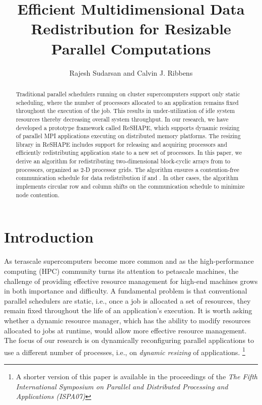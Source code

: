 \documentclass[letterpaper]{llncs}
\title{\bf Efficient Multidimensional Data Redistribution for Resizable Parallel Computations\\ 
}
\author{Rajesh Sudarsan and Calvin J. Ribbens}
\institute{Department of Computer Science\\
Virginia Tech, Blacksburg, VA 24061-0106 \\
\email{\{sudarsar, ribbens\}@vt.edu}}
\begin{document}
\maketitle
\thispagestyle{empty}
\begin{abstract}
Traditional parallel schedulers running on cluster supercomputers
support only static scheduling, where the number of processors
allocated to an application remains fixed throughout the  execution of the job.
This results in under-utilization of idle system resources 
thereby decreasing overall system throughput.
In our research, we have developed a
prototype framework called ReSHAPE, which supports dynamic resizing of
parallel MPI applications executing on distributed memory platforms.
The resizing library in ReSHAPE includes support for releasing and acquiring
processors and efficiently redistributing application state to a new
set of processors. In this paper, we derive an algorithm for redistributing
two-dimensional block-cyclic arrays from  to  processors, organized
as 2-D processor grids. The algorithm ensures
a contention-free communication schedule for data redistribution
if  and .
In other cases, the algorithm implements
circular row and column shifts on the communication schedule
 to minimize node contention.
\end{abstract}


\section{Introduction}
As terascale supercomputers become more common and as the high-performance computing (HPC) community turns its attention to petascale machines, 
the challenge of providing effective resource management for high-end machines grows in both importance and difficulty. 
A fundamental problem is that conventional parallel schedulers are static, i.e., 
 once a job is allocated a set of resources, they remain fixed throughout the 
life of an application's execution.
It is worth asking whether a dynamic resource manager, which has the ability to 
modify resources allocated to jobs at runtime, would allow more effective resource 
management. The focus of our research is on dynamically reconfiguring parallel 
applications to use a different number of processes, i.e., on 
\textit{dynamic resizing} of applications.
\footnote{A shorter version of this paper is available in the proceedings of the \textit{The Fifth International Symposium on Parallel and Distributed Processing and Applications (ISPA07)}}
\end{document}
